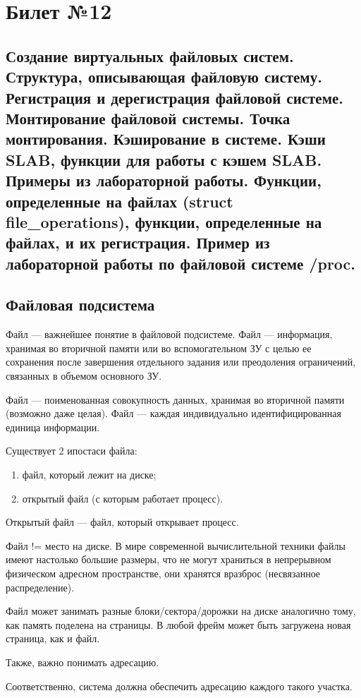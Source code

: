 \chapter{Билет №12}

\section*{Создание виртуальных файловых систем. Структура, описывающая файловую систему. Регистрация и дерегистрация файловой системе. Монтирование файловой системы. Точка монтирования. Кэширование в системе. Кэши SLAB, функции для работы с кэшем SLAB. Примеры из лабораторной работы. Функции, определенные на файлах (struct file\_operations), функции, определенные на файлах, и их регистрация. Пример из лабораторной работы по файловой системе /proc.}

\section{Файловая подсистема}
Файл --- важнейшее понятие в файловой подсистеме. Файл --- информация, хранимая во вторичной памяти или во вспомогательном ЗУ с целью ее сохранения после завершения отдельного задания или преодоления ограничений, связанных в объемом основного ЗУ.

Файл --- поименованная совокупность данных, хранимая во вторичной памяти (возможно даже целая). Файл --- каждая индивидуально идентифицированная единица информации.

Существует 2 ипостаси файла:
\begin{enumerate}
	\item файл, который лежит на диске;
	\item открытый файл (с которым работает процесс).
\end{enumerate}

Открытый файл --- файл, который открывает процесс.

Файл != место на диске. В мире современной вычислительной техники файлы имеют настолько большие размеры, что не могут храниться в непрерывном физическом адресном пространстве, они хранятся вразброс (несвязанное распределение).

Файл может занимать разные блоки/сектора/дорожки на диске аналогично тому, как память поделена на страницы. В любой фрейм может быть загружена новая страница, как и файл. 

Также, важно понимать адресацию. 

Соответственно, система должна обеспечить адресацию каждого такого участка.

